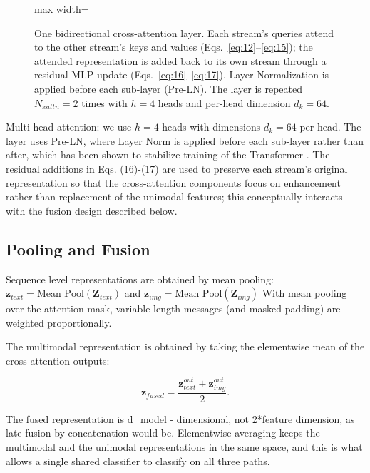\documentclass[10pt,twoside]{article}
\begin{document}
\begin{figure}[t]
\begin{adjustbox}{max width=\textwidth}
\end{adjustbox}
\caption{One bidirectional cross-attention layer. Each stream's queries attend to the other stream's keys and values (Eqs.~\eqref{eq:12}--\eqref{eq:15}); the attended representation is added back to its own stream through a residual MLP update (Eqs.~\eqref{eq:16}--\eqref{eq:17}). Layer Normalization is applied before each sub-layer (Pre-LN). The layer is repeated $N_{xattn} = 2$ times with $h = 4$ heads and per-head dimension $d_k = 64$.}
\label{fig:crossattention}
\end{figure}

Multi-head attention: we use $h = 4$ heads with dimensions $d_{k} = 64$ per head. The layer uses Pre-LN, where Layer Norm is applied before each sub-layer rather than after, which has been shown to stabilize training of the Transformer \citep{xiong2020layernorm}. The residual additions in Eqs. (16)-(17) are used to preserve each stream's original representation so that the cross-attention components focus on enhancement rather than replacement of the unimodal features; this conceptually interacts with the fusion design described below.

\subsection{Pooling and Fusion}\label{sec:5.6}

Sequence level representations are obtained by mean pooling: $\mathbf{z}_{text} = \text{Mean Pool}(\mathbf{Z}_{text})$ and $\mathbf{z}_{img} = \text{Mean Pool}(\mathbf{Z}_{img})$ With mean pooling over the attention mask, variable-length messages (and masked padding) are weighted proportionally.

The multimodal representation is obtained by taking the elementwise mean of the cross-attention outputs:

\begin{equation}\label{eq:18}
\mathbf{z}_{fused} = \frac{\mathbf{z}_{text}^{out} + \mathbf{z}_{img}^{out}}{2}.
\end{equation}

The fused representation is d\_{model} - dimensional, not 2*feature dimension, as late fusion by concatenation would be. Elementwise averaging keeps the multimodal and the unimodal representations in the same space, and this is what allows a single shared classifier to classify on all three paths.
\end{document}
